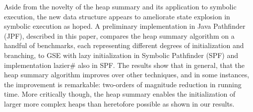 Aside from the novelty of the heap summary and its application to
symbolic execution, the new data structure appears to ameliorate state
explosion in symbolic execution as hoped. A preliminary implementation in Java
Pathfinder (JPF), described in this paper, compares the heap summary
algorithm on a handful of benchmarks, each representing different
degrees of initialization and branching, to GSE with lazy
initialization in Symbolic Pathfinder (SPF) and implementation
lazier\# also in SPF. The results show that in general, that the heap
summary algorithm improves over other techniques, and in some
instances, the improvement is remarkable: two-orders of magnitude
reduction in running time. More critically though, the heap summary
enables the initialization of larger more complex heaps than
heretofore possible as shown in our results.

\begin{comment}
We implement the summary heap algorithm as an extension to \emph{Java
  PathFinder} (JPF) and compare it to GSE with lazy initialization in
\emph{Symbolic Pathfinder (SPF)} and an implementation of lazier\#
initialization in SPF.  The comparison shows on some examples up to a two-order of magnitude
reduction in the total time taken to explore the same state space
defined by the bound on the longest heap reference chain.  For these
examples, we show that where other GSE approaches are unable to
complete exploration within the provided time bound, the summary heap
finishes exploration in a few seconds.
\end{comment}







